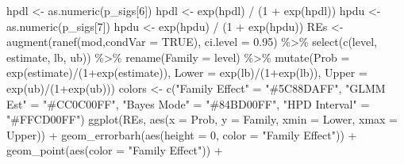 \documentclass[12pt]{article}
\newenvironment{Shaded}{\begin{snugshade}}{\end{snugshade}}
\newcommand{\AttributeTok}[1]{\textcolor[rgb]{0.77,0.63,0.00}{#1}}
\newcommand{\ConstantTok}[1]{\textcolor[rgb]{0.00,0.00,0.00}{#1}}
\newcommand{\DecValTok}[1]{\textcolor[rgb]{0.00,0.00,0.81}{#1}}
\newcommand{\FloatTok}[1]{\textcolor[rgb]{0.00,0.00,0.81}{#1}}
\newcommand{\FunctionTok}[1]{\textcolor[rgb]{0.00,0.00,0.00}{#1}}
\newcommand{\NormalTok}[1]{#1}
\newcommand{\OtherTok}[1]{\textcolor[rgb]{0.56,0.35,0.01}{#1}}
\newcommand{\SpecialCharTok}[1]{\textcolor[rgb]{0.00,0.00,0.00}{#1}}
\newcommand{\StringTok}[1]{\textcolor[rgb]{0.31,0.60,0.02}{#1}}
\begin{document}
\begin{Shaded}
\begin{Highlighting}[]
\NormalTok{hpdl }\OtherTok{\textless{}{-}} \FunctionTok{as.numeric}\NormalTok{(p\_sigs[}\DecValTok{6}\NormalTok{])}
\NormalTok{hpdl }\OtherTok{\textless{}{-}} \FunctionTok{exp}\NormalTok{(hpdl) }\SpecialCharTok{/}\NormalTok{ (}\DecValTok{1} \SpecialCharTok{+} \FunctionTok{exp}\NormalTok{(hpdl))}
\NormalTok{hpdu }\OtherTok{\textless{}{-}} \FunctionTok{as.numeric}\NormalTok{(p\_sigs[}\DecValTok{7}\NormalTok{])}
\NormalTok{hpdu }\OtherTok{\textless{}{-}} \FunctionTok{exp}\NormalTok{(hpdu) }\SpecialCharTok{/}\NormalTok{ (}\DecValTok{1} \SpecialCharTok{+} \FunctionTok{exp}\NormalTok{(hpdu))}
\NormalTok{REs }\OtherTok{\textless{}{-}} \FunctionTok{augment}\NormalTok{(}\FunctionTok{ranef}\NormalTok{(mod,}\AttributeTok{condVar =} \ConstantTok{TRUE}\NormalTok{), }\AttributeTok{ci.level =} \FloatTok{0.95}\NormalTok{) }\SpecialCharTok{\%\textgreater{}\%}
  \FunctionTok{select}\NormalTok{(}\FunctionTok{c}\NormalTok{(level, estimate, lb, ub)) }\SpecialCharTok{\%\textgreater{}\%}
  \FunctionTok{rename}\NormalTok{(}\AttributeTok{Family =}\NormalTok{ level) }\SpecialCharTok{\%\textgreater{}\%}
  \FunctionTok{mutate}\NormalTok{(}\AttributeTok{Prob =} \FunctionTok{exp}\NormalTok{(estimate)}\SpecialCharTok{/}\NormalTok{(}\DecValTok{1}\SpecialCharTok{+}\FunctionTok{exp}\NormalTok{(estimate)),}
         \AttributeTok{Lower =} \FunctionTok{exp}\NormalTok{(lb)}\SpecialCharTok{/}\NormalTok{(}\DecValTok{1}\SpecialCharTok{+}\FunctionTok{exp}\NormalTok{(lb)),}
         \AttributeTok{Upper =} \FunctionTok{exp}\NormalTok{(ub)}\SpecialCharTok{/}\NormalTok{(}\DecValTok{1}\SpecialCharTok{+}\FunctionTok{exp}\NormalTok{(ub)))}
\NormalTok{colors }\OtherTok{\textless{}{-}} \FunctionTok{c}\NormalTok{(}\StringTok{"Family Effect"} \OtherTok{=} \StringTok{"\#5C88DAFF"}\NormalTok{, }\StringTok{"GLMM Est"} \OtherTok{=} \StringTok{"\#CC0C00FF"}\NormalTok{, }\StringTok{"Bayes Mode"} \OtherTok{=} \StringTok{"\#84BD00FF"}\NormalTok{,}
            \StringTok{"HPD Interval"} \OtherTok{=} \StringTok{"\#FFCD00FF"}\NormalTok{)}
\FunctionTok{ggplot}\NormalTok{(REs, }\FunctionTok{aes}\NormalTok{(}\AttributeTok{x =}\NormalTok{ Prob, }\AttributeTok{y =}\NormalTok{ Family, }\AttributeTok{xmin =}\NormalTok{ Lower, }\AttributeTok{xmax =}\NormalTok{ Upper)) }\SpecialCharTok{+}
  \FunctionTok{geom\_errorbarh}\NormalTok{(}\FunctionTok{aes}\NormalTok{(}\AttributeTok{height =} \DecValTok{0}\NormalTok{, }\AttributeTok{color =} \StringTok{"Family Effect"}\NormalTok{)) }\SpecialCharTok{+}
  \FunctionTok{geom\_point}\NormalTok{(}\FunctionTok{aes}\NormalTok{(}\AttributeTok{color =} \StringTok{"Family Effect"}\NormalTok{)) }\SpecialCharTok{+}

\end{Highlighting}
\end{Shaded}
\end{document}
